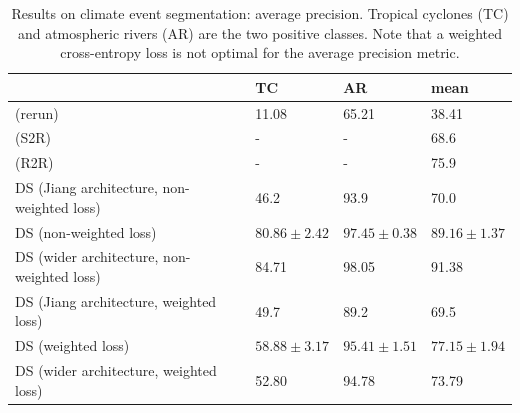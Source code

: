 \documentclass{article} %
\newcommand{\todo}[1]{{\color[rgb]{.6,.1,.6}{#1}}}
\begin{document}
\begin{table}
	\centering
	\begin{tabular}{l l l l}
		\toprule
        & TC & AR & mean \\
		\midrule
		\cite{jiang2019sphericalcnn} (rerun) & 11.08 & 65.21 & 38.41 \\
        \cite{cohen2019gauge} (S2R) & - & -& 68.6 \\
        \cite{cohen2019gauge} (R2R) & - & -& 75.9 \\
		\midrule
        DS (Jiang architecture, non-weighted loss) & 46.2 & 93.9 & 70.0 \\
        DS (non-weighted loss) & $80.86\pm 2.42$ & $97.45\pm 0.38$ & $89.16\pm 1.37$ \\
        DS (wider architecture, non-weighted loss) & 84.71 & 98.05 & 91.38 \\
		\midrule
        DS (Jiang architecture, weighted loss) & 49.7 & 89.2 & 69.5 \\
        DS (weighted loss) & $58.88\pm 3.17$ & $95.41\pm 1.51$ & $77.15\pm 1.94$ \\
        DS (wider architecture, weighted loss) & 52.80 & 94.78 & 73.79 \\
		\bottomrule
    \end{tabular}
    \caption{
		Results on climate event segmentation: average precision.
		Tropical cyclones (TC) and atmospheric rivers (AR) are the two positive classes.
		Note that a weighted cross-entropy loss is not optimal for the average precision metric.
	}
		\label{tab:climate:map}
\end{table}
\end{document}

